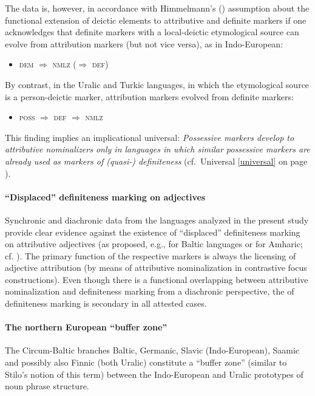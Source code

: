 The data is, however, in accordance with Himmelmann's (\citeyear[220–221]{himmelmann1997}) assumption about the functional extension of deictic elements to attributive and definite markers if one acknowledges that definite markers with a local-deictic etymological source can evolve from attribution markers (but not vice versa), as in Indo-European:
\begin{itemize}
\item \textsc{dem $\Rightarrow$ nmlz ($\Rightarrow$ def)}
\end{itemize}
By contrast, in the Uralic and Turkic languages, in which the etymological source is a person-deictic marker, attribution markers evolved from definite markers:
\begin{itemize}
\item \textsc{poss $\Rightarrow$ def $\Rightarrow$ nmlz}
\end{itemize}
This finding implies an implicational universal: \textit{Possessive markers develop to attributive nominalizers only in languages in which similar possessive markers are already used as markers of (quasi-) definiteness} (cf.~Universal \ref{universal} on page \pageref{universal}).

\paragraph*{“Displaced” definiteness marking on adjectives}
Synchronic and diachronic data from the languages analyzed in the present study provide clear evidence against the existence of “displaced” definiteness marking on attributive adjectives (as proposed, e.g., for Baltic languages or for Amharic; cf. \citealt[122]{dahl2015a}). The primary function of the respective markers is always the licensing of adjective attribution (by means of attributive nominalization in contrastive focus constructions). Even though there is a functional overlapping between attributive nominalization and definiteness marking from a diachronic perspective, the  of definiteness marking is secondary in all attested cases.

\paragraph*{The northern European “buffer zone”}
The Circum-Baltic branches Baltic, Germanic, Slavic (Indo-European), Saamic and possibly also Finnic (both Uralic) constitute a “buffer zone” (similar to Stilo's \citeyear{stilo2005} notion of this term) between the Indo-European and Uralic prototypes of noun phrase structure.

